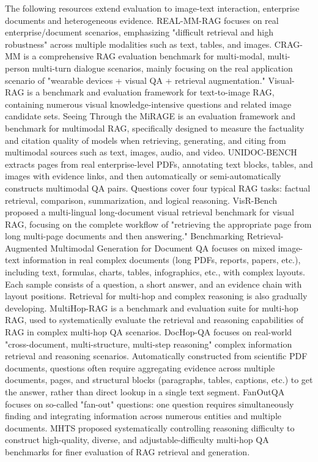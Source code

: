 The following resources extend evaluation to image-text interaction, enterprise documents and heterogeneous evidence. REAL-MM-RAG \cite{realmmrag2025} focuses on real enterprise/document scenarios, emphasizing "difficult retrieval and high robustness" across multiple modalities such as text, tables, and images. CRAG-MM \cite{cragmm2024} is a comprehensive RAG evaluation benchmark for multi-modal, multi-person multi-turn dialogue scenarios, mainly focusing on the real application scenario of "wearable devices + visual QA + retrieval augmentation." Visual-RAG \cite{visualrag2025} is a benchmark and evaluation framework for text-to-image RAG, containing numerous visual knowledge-intensive questions and related image candidate sets. Seeing Through the MiRAGE \cite{mirage2025} is an evaluation framework and benchmark for multimodal RAG, specifically designed to measure the factuality and citation quality of models when retrieving, generating, and citing from multimodal sources such as text, images, audio, and video. UNIDOC-BENCH \cite{unidocbench2025} extracts pages from real enterprise-level PDFs, annotating text blocks, tables, and images with evidence links, and then automatically or semi-automatically constructs multimodal QA pairs. Questions cover four typical RAG tasks: factual retrieval, comparison, summarization, and logical reasoning. VisR-Bench \cite{visrbench2025} proposed a multi-lingual long-document visual retrieval benchmark for visual RAG, focusing on the complete workflow of "retrieving the appropriate page from long multi-page documents and then answering." Benchmarking Retrieval-Augmented Multimodal Generation for Document QA \cite{benchmarkmmrag2025} focuses on mixed image-text information in real complex documents (long PDFs, reports, papers, etc.), including text, formulas, charts, tables, infographics, etc., with complex layouts. Each sample consists of a question, a short answer, and an evidence chain with layout positions. Retrieval for multi-hop and complex reasoning is also gradually developing. MultiHop-RAG \cite{multihoprag2024} is a benchmark and evaluation suite for multi-hop RAG, used to systematically evaluate the retrieval and reasoning capabilities of RAG in complex multi-hop QA scenarios. DocHop-QA \cite{dochopqa2025} focuses on real-world "cross-document, multi-structure, multi-step reasoning" complex information retrieval and reasoning scenarios. Automatically constructed from scientific PDF documents, questions often require aggregating evidence across multiple documents, pages, and structural blocks (paragraphs, tables, captions, etc.) to get the answer, rather than direct lookup in a single text segment. FanOutQA \cite{fanoutqa2024} focuses on so-called "fan-out" questions: one question requires simultaneously finding and integrating information across numerous entities and multiple documents. MHTS \cite{mhts2025} proposed systematically controlling reasoning difficulty to construct high-quality, diverse, and adjustable-difficulty multi-hop QA benchmarks for finer evaluation of RAG retrieval and generation.

